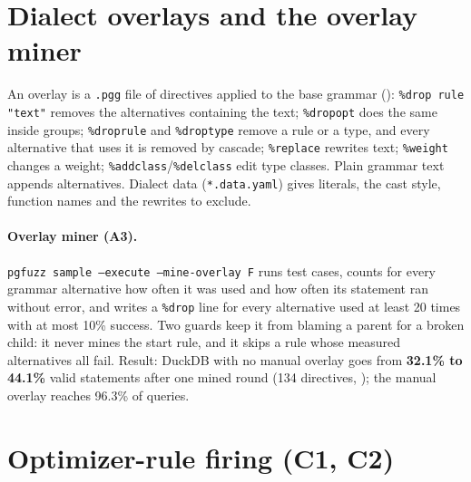 \section{Dialect overlays and the overlay miner}

An overlay is a \texttt{.pgg} file of directives applied to the base grammar
(): \texttt{\%drop rule "text"} removes the
alternatives containing the text; \texttt{\%dropopt} does the same inside groups;
\texttt{\%droprule} and \texttt{\%droptype} remove a rule or a type, and every
alternative that uses it is removed by cascade; \texttt{\%replace} rewrites
text; \texttt{\%weight} changes a weight; \texttt{\%addclass}/\texttt{\%delclass}
edit type classes. Plain grammar text appends alternatives. Dialect data
(\texttt{*.data.yaml}) gives literals, the cast style, function names and the
rewrites to exclude.

\paragraph{Overlay miner (A3).} \texttt{pgfuzz sample --execute --mine-overlay
F} runs test cases, counts for every grammar alternative how often it was used
and how often its statement ran without error, and writes a \texttt{\%drop}
line for every alternative used at least 20 times with at most 10\% success.
Two guards keep it from blaming a parent for a broken child: it never mines the
start rule, and it skips a rule whose measured alternatives all fail. Result:
DuckDB with no manual overlay goes from \textbf{32.1\% to 44.1\%} valid
statements after one mined round (134 directives,
); the manual overlay reaches
96.3\% of queries.

\section{Optimizer-rule firing (C1, C2)}

